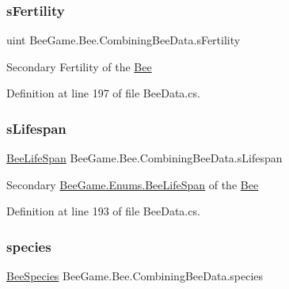 \subsubsection{\texorpdfstring{s\+Fertility}{sFertility}}
{\footnotesize\ttfamily uint Bee\+Game.\+Bee.\+Combining\+Bee\+Data.\+s\+Fertility}



Secondary Fertility of the \hyperlink{namespace_bee_game_1_1_bee}{Bee} 



Definition at line 197 of file Bee\+Data.\+cs.

\mbox{\label{struct_bee_game_1_1_bee_1_1_combining_bee_data_a2635fae2aa8e50991d7733624883e671}} 
\subsubsection{\texorpdfstring{s\+Lifespan}{sLifespan}}
{\footnotesize\ttfamily \hyperlink{namespace_bee_game_1_1_enums_ae3853807ded2f4d99a0d4a7fb4b2bc46}{Bee\+Life\+Span} Bee\+Game.\+Bee.\+Combining\+Bee\+Data.\+s\+Lifespan}



Secondary \hyperlink{namespace_bee_game_1_1_enums_ae3853807ded2f4d99a0d4a7fb4b2bc46}{Bee\+Game.\+Enums.\+Bee\+Life\+Span} of the \hyperlink{namespace_bee_game_1_1_bee}{Bee} 



Definition at line 193 of file Bee\+Data.\+cs.

\mbox{\label{struct_bee_game_1_1_bee_1_1_combining_bee_data_a7e519ea913d51073b7da7815e85a4eeb}} 
\subsubsection{\texorpdfstring{species}{species}}
{\footnotesize\ttfamily \hyperlink{namespace_bee_game_1_1_enums_aa2ead984825678d83c42d48f6382619c}{Bee\+Species} Bee\+Game.\+Bee.\+Combining\+Bee\+Data.\+species}



